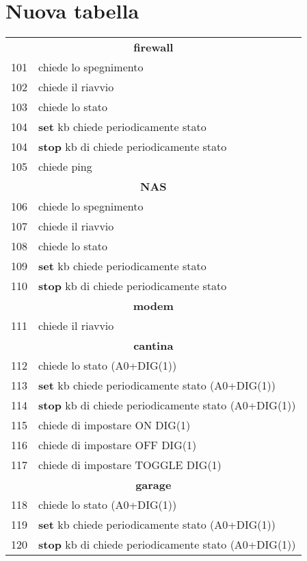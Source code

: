 \documentclass{article}
\begin{document}
    \section{Nuova tabella}
    
    \begin{tabular}{ll}
        \multicolumn{2}{c}{\textbf{firewall}}\\
        101 & chiede lo spegnimento\\
        102 & chiede il riavvio\\
        103 & chiede lo stato\\
        104 & \textbf{set} kb chiede periodicamente stato\\
        104 & \textbf{stop} kb di chiede periodicamente stato\\
        105 & chiede ping\\
        \multicolumn{2}{c}{\textbf{NAS}}\\
        106 & chiede lo spegnimento\\
        107 & chiede il riavvio\\
        108 & chiede lo stato\\
        109 & \textbf{set} kb chiede periodicamente stato\\
        110 & \textbf{stop} kb di chiede periodicamente stato\\
        \multicolumn{2}{c}{\textbf{modem}}\\
        111 & chiede il riavvio\\
        \multicolumn{2}{c}{\textbf{cantina}}\\
        112 & chiede lo stato (A0+DIG(1))\\
        113 & \textbf{set} kb chiede periodicamente stato (A0+DIG(1))\\
        114 & \textbf{stop} kb di chiede periodicamente stato (A0+DIG(1))\\
        115 & chiede di impostare ON DIG(1)     \\
        116 & chiede di impostare OFF DIG(1)    \\
        117 & chiede di impostare TOGGLE DIG(1) \\
        \multicolumn{2}{c}{\textbf{garage}}\\
        118 & chiede lo stato (A0+DIG(1))\\
        119 & \textbf{set} kb chiede periodicamente stato (A0+DIG(1))\\
        120 & \textbf{stop} kb di chiede periodicamente stato (A0+DIG(1))\\

\end{tabular}
\end{document}
